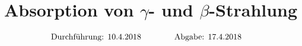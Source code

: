 

\subject{V704}
\title{Absorption von \texorpdfstring{$\gamma$}{gamma}- und \texorpdfstring{$\beta$}{beta}-Strahlung}

\date{
  \begin{align}
    \text{Durchführung: } & \text{10.4.2018} & \hspace{3em} & \text{Abgabe: 17.4.2018} \notag
  \end{align}
}




\maketitle
\thispagestyle{empty}
\tableofcontents
\newpage






\printbibliography{}


